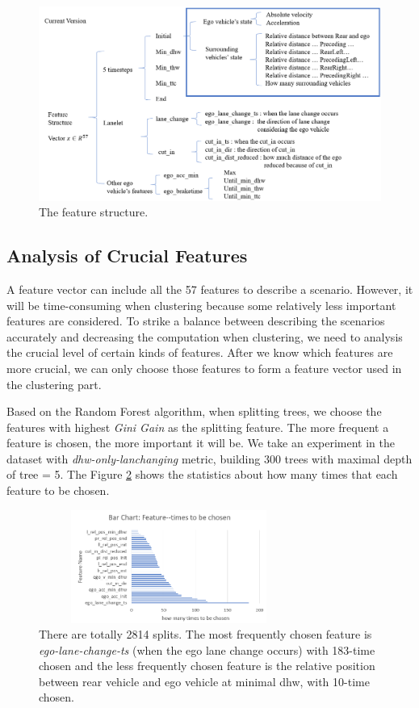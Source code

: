 \documentclass[conference]{IEEEtran}
\begin{document}
\begin{figure}[!h]
  \centering
  \includegraphics[width=6in]{./images/CurrentVersion.png}
  \caption{The feature structure.}
  \label{fig:FeatureSturcture}
  \end{figure}


\subsection{Analysis of Crucial Features}
A feature vector can include all the 57 features to describe a scenario. However, it will be time-consuming when clustering because some relatively less important features are considered. To strike a balance between describing the scenarios accurately and decreasing the computation when clustering, we need to analysis the crucial level of certain kinds of features. After we know which features are more crucial, we can only choose those features to form a feature vector used in the clustering part.

Based on the Random Forest algorithm, when splitting trees, we choose the features with highest \textit{Gini Gain} as the splitting feature. The more frequent a feature is chosen, the more important it will be. We take an experiment in the dataset with \textit{dhw-only-lanchanging} metric, building 300 trees with maximal depth of tree = 5. The Figure \ref{fig:BarChart_Feature--times} shows the statistics about how many times that each feature to be chosen.

\begin{figure}[!h]
  \centering
  \includegraphics[width=8.5cm,height=3.7cm]{./images/BarChartFeatureTimes.png}
  \caption{There are totally 2814 splits. The most frequently chosen feature is \textit{ego-lane-change-ts} (when the ego lane change occurs) with 183-time chosen and the less frequently chosen feature is the relative position between rear vehicle and ego vehicle at minimal dhw, with 10-time chosen.}
  \label{fig:BarChart_Feature--times}
  \end{figure}
  
\end{document}
